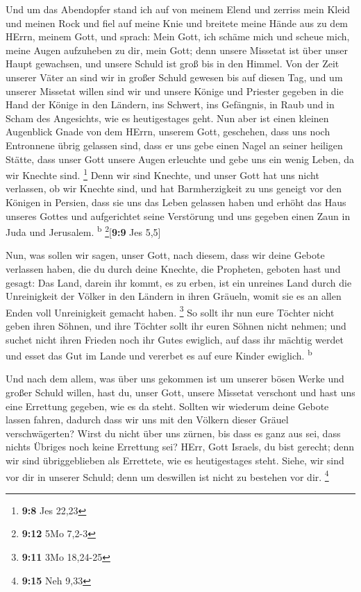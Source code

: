  Und um das Abendopfer stand ich auf von meinem Elend und
zerriss mein Kleid und meinen Rock und fiel auf meine Knie und breitete
meine Hände aus zu dem HErrn, meinem Gott,  und sprach:
Mein Gott, ich schäme mich und scheue mich, meine Augen aufzuheben zu
dir, mein Gott; denn unsere Missetat ist über unser Haupt gewachsen, und
unsere Schuld ist groß bis in den Himmel.  Von der Zeit
unserer Väter an sind wir in großer Schuld gewesen bis auf diesen Tag,
und um unserer Missetat willen sind wir und unsere Könige und Priester
gegeben in die Hand der Könige in den Ländern, ins Schwert, ins
Gefängnis, in Raub und in Scham des Angesichts, wie es heutigestages
geht.  Nun aber ist einen kleinen Augenblick Gnade von dem
HErrn, unserem Gott, geschehen, dass uns noch Entronnene übrig gelassen
sind, dass er uns gebe einen Nagel an seiner heiligen Stätte, dass unser
Gott unsere Augen erleuchte und gebe uns ein wenig Leben, da wir Knechte
sind. \footnote{\textbf{9:8} Jes 22,23}  Denn wir sind
Knechte, und unser Gott hat uns nicht verlassen, ob wir Knechte sind,
und hat Barmherzigkeit zu uns geneigt vor den Königen in Persien, dass
sie uns das Leben gelassen haben und erhöht das Haus unseres Gottes und
aufgerichtet seine Verstörung und uns gegeben einen Zaun in Juda und
Jerusalem. \textsuperscript{b} \footnote{\textbf{9:12} 5Mo 7,2-3}{[}\textbf{9:9}
Jes 5,5{]}

 Nun, was sollen wir sagen, unser Gott, nach diesem, dass
wir deine Gebote verlassen haben,  die du durch deine
Knechte, die Propheten, geboten hast und gesagt: Das Land, darein ihr
kommt, es zu erben, ist ein unreines Land durch die Unreinigkeit der
Völker in den Ländern in ihren Gräueln, womit sie es an allen Enden voll
Unreinigkeit gemacht haben. \footnote{\textbf{9:11} 3Mo 18,24-25}
 So sollt ihr nun eure Töchter nicht geben ihren Söhnen,
und ihre Töchter sollt ihr euren Söhnen nicht nehmen; und suchet nicht
ihren Frieden noch ihr Gutes ewiglich, auf dass ihr mächtig werdet und
esset das Gut im Lande und vererbet es auf eure Kinder ewiglich.
\textsuperscript{b}

 Und nach dem allem, was über uns gekommen ist um unserer
bösen Werke und großer Schuld willen, hast du, unser Gott, unsere
Missetat verschont und hast uns eine Errettung gegeben, wie es da steht.
 Sollten wir wiederum deine Gebote lassen fahren, dadurch
dass wir uns mit den Völkern dieser Gräuel verschwägerten? Wirst du
nicht über uns zürnen, bis dass es ganz aus sei, dass nichts Übriges
noch keine Errettung sei?  HErr, Gott Israels, du bist
gerecht; denn wir sind übriggeblieben als Errettete, wie es
heutigestages steht. Siehe, wir sind vor dir in unserer Schuld; denn um
deswillen ist nicht zu bestehen vor dir. \footnote{\textbf{9:15} Neh
  9,33}

